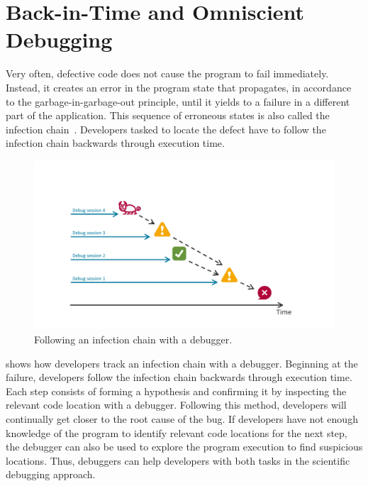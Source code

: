 \section{Back-in-Time and Omniscient Debugging}
\label{sec:omni-debugging}

Very often, defective code does not cause the program to fail immediately.
Instead, it creates an error in the program state that propagates, in accordance to the garbage-in-garbage-out principle, until it yields to a failure in a different part of the application.
This sequence of erroneous states is also called the infection chain~\cite{zeller09:why_programs_fail}.
Developers tasked to locate the defect have to follow the infection chain backwards through execution time.


\begin{figure}[th]
\centering
\includegraphics[width=.9\linewidth]{img/workflow-traditional}
\caption{Following an infection chain with a debugger.}
\label{fig:workflow-traditional}
\end{figure}

 shows how developers track an infection chain with a debugger.
Beginning at the failure, developers follow the infection chain backwards through execution time.
Each step consists of forming a hypothesis and confirming it by inspecting the relevant code location with a debugger. 
Following this method, developers will continually get closer to the root cause of the bug.
If developers have not enough knowledge of the program to identify relevant code locations for the next step, the debugger can also be used to explore the program execution to find suspicious locations.
Thus, debuggers can help developers with both tasks in the scientific debugging approach.


